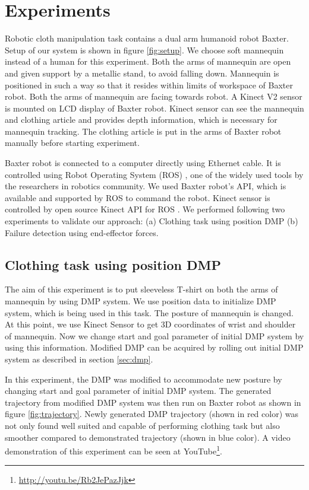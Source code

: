 \documentclass[sigconf]{acmart}
\begin{document}
\section{Experiments}
\label{sec:experiments}
Robotic cloth manipulation task contains a dual arm humanoid robot Baxter. Setup of our system is shown in figure \ref{fig:setup}. We choose soft mannequin instead of a human for this experiment. Both the arms of mannequin are open and given support by a metallic stand, to avoid falling down. Mannequin is positioned in such a way so that it resides within limits of workspace of Baxter robot. Both the arms of mannequin are facing towards robot. A Kinect V2 \cite{microsoft2014kinect} sensor is mounted on LCD display of Baxter robot. Kinect sensor can see the mannequin and clothing article and provides depth information, which is necessary for mannequin tracking. The clothing article is put in the arms of Baxter robot manually before starting experiment.

Baxter robot is connected to a computer directly using Ethernet cable. It is controlled using Robot Operating System (ROS) \cite{quigley2009ros}, one of the widely used tools by the researchers in robotics community. We used Baxter robot's API, which is available and supported by ROS to command the robot. Kinect sensor is controlled by open source Kinect API for ROS \cite{iai_kinect2, libfreenect2}. We performed following two experiments to validate our approach: (a) Clothing task using position DMP (b) Failure detection using end-effector forces.

\subsection{Clothing task using position DMP}
The aim of this experiment is to put sleeveless T-shirt on both the arms of mannequin by using DMP system. We use position data to initialize DMP system, which is being used in this task. The posture of mannequin is changed. At this point, we use Kinect Sensor to get 3D coordinates of wrist and shoulder of mannequin. Now we change start and goal parameter of initial DMP system by using this information. Modified DMP can be acquired by rolling out initial DMP system as described in section \ref{sec:dmp}.

In this experiment, the DMP was modified to accommodate new posture by changing start and goal parameter of initial DMP system. The generated trajectory from modified DMP system was then run on Baxter robot as shown in figure \ref{fig:trajectory}. Newly generated DMP trajectory (shown in red color) was not only found well suited and capable of performing clothing task but also smoother compared to demonstrated trajectory (shown in blue color). A video demonstration of this experiment can be seen at YouTube\footnote{\url{http://youtu.be/Rb2JePazJjk}}.
\end{document}
